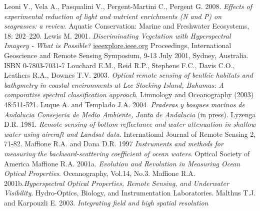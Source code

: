\documentclass[11pt]{article}
\begin{document}
\begin{thebibliography}{999}
Leoni V., Vela A., Pasqualini V., Pergent-Martini C., Pergent G. 2008. \emph{Effects of experimental reduction of light and nutrient enrichments (N and P) on seagrasses: a review}.
Aquatic Conservation: Marine and Freshwater Ecosystems, 18: 202–220. \pageref{Leoni08}
Lewis M. 2001. \emph{Discriminating Vegetation with Hyperspectral Imagery - What is
Possible?} \href{http://www.ieeexplore.ieee.org/stamp/stamp.jsp?arnumber=00978199}{ieeexplore.ieee.org} Proceedings,
International Geoscience and Remote Sensing Symposium, 9-13 July 2001, Sydney, Australia. ISBN 0-7803-7031-7 \pageref{Lewis01}
Louchard E.M., Reid R.P., Stephens F.C., Davis C.O., Leathers R.A., Downes T.V. 2003. \emph{Optical remote sensing of benthic habitats and bathymetry in coastal environments at Lee Stocking Island, Bahamas: A comparative spectral classification approach}. Limnology
and Oceanography (2003) 48:511-521. \pageref{Louchard03}
Luque A. and Templado J.A. 2004. \emph{Praderas y bosques marinos de Andalucia
Consejeria de Medio Ambiente, Junta de Andalucia} (in press). \pageref{Luque04}
Lyzenga D.R. 1981. \emph{Remote sensing of bottom reflectance and water attenuation in
shallow water using aircraft and Landsat data}. International Journal of Remote Sensing 2,
71-82. \pageref{Lyzenga81}
Maffione R.A. and Dana D.R. 1997 \emph{Instruments and methods for measuring the
backward-scattering coefficient of ocean waters}. Optical Society of America \pageref{Maffione97}
Maffione R.A. 2001a. \emph{Evolution and Revolution in Measuring Ocean Optical Properties}.
Oceanography, Vol.14, No.3. \pageref{Maffione01a}
Maffione R.A. 2001b.\emph{Hyperspectral Optical Properties, Remote Sensing, and
Underwater Visibility}. Hydro-Optics, Biology, and Instrumentation Laboratories. \pageref{Maffione01b}
Malthus T.J. and Karpouzli E. 2003. \emph{Integrating field and high spatial resolution
}
\end{thebibliography}
\end{document}
